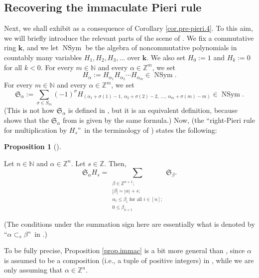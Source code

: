 \documentclass
[numbers=enddot,12pt,final,onecolumn,notitlepage,english]{scrartcl}%
\theoremstyle{definition}
\newtheorem{prop}[theo]{Proposition}
\newenvironment{proposition}[1][]
{\begin{prop}[#1]\begin{leftbar}}
{\end{leftbar}\end{prop}}
\let\sumnonlimits\sum
\renewcommand{\sum}{\sumnonlimits\limits}
\begin{document}
\subsection{Recovering the immaculate Pieri rule}

Next, we shall exhibit \cite[Theorem 3.5]{BBSSZ13} as a consequence of
Corollary \ref{cor.pre-pieri.4}. To this aim, we will briefly introduce the
relevant parts of the scene of \cite[Theorem 3.5]{BBSSZ13}. We fix a
commutative ring $\mathbf{k}$, and we let $\operatorname*{NSym}$ be the
algebra of noncommutative polynomials in countably many variables $H_{1}%
,H_{2},H_{3},\ldots$ over $\mathbf{k}$. We also set $H_{0}:=1$ and $H_{k}:=0$
for all $k<0$. For every $m\in\mathbb{N}$ and every $\alpha\in\mathbb{Z}^{m}$,
we set%
\[
H_{\alpha}:=H_{\alpha_{1}}H_{\alpha_{2}}\cdots H_{\alpha_{m}}\in
\operatorname*{NSym}.
\]
For every $m\in\mathbb{N}$ and every $\alpha\in\mathbb{Z}^{m}$, we set
\[
\mathfrak{S}_{\alpha}:=\sum_{\sigma\in S_{m}}\left(  -1\right)  ^{\sigma
}H_{\left(  \alpha_{1}+\sigma\left(  1\right)  -1,\ \alpha_{2}+\sigma\left(
2\right)  -2,\ \ldots,\ \alpha_{m}+\sigma\left(  m\right)  -m\right)  }%
\in\operatorname*{NSym}.
\]
(This is not how $\mathfrak{S}_{\alpha}$ is defined in \cite{BBSSZ13}, but it
is an equivalent definition, because \cite[Theorem 3.27]{BBSSZ13} shows that
the $\mathfrak{S}_{\alpha}$ from \cite{BBSSZ13} is given by the same formula.)
Now, \cite[Theorem 3.5]{BBSSZ13} (the \textquotedblleft right-Pieri rule for
multiplication by $H_{s}$\textquotedblright\ in the terminology of
\cite{BBSSZ13}) states the following:

\begin{proposition}
\label{prop.immac}Let $n\in\mathbb{N}$ and $\alpha\in\mathbb{Z}^{n}$. Let
$s\in\mathbb{Z}$. Then,%
\[
\mathfrak{S}_{\alpha}H_{s}=\sum_{\substack{\beta\in\mathbb{Z}^{n+1}%
;\\\left\vert \beta\right\vert =\left\vert \alpha\right\vert +s;\\\alpha
_{i}\leq\beta_{i}\text{ for all }i\in\left[  n\right]  ;\\0\leq\beta_{n+1}%
}}\mathfrak{S}_{\beta}.
\]

\end{proposition}

(The conditions under the summation sign here are essentially what is denoted
by \textquotedblleft$\alpha\subset_{s}\beta$\textquotedblright\ in
\cite{BBSSZ13}.)

To be fully precise, Proposition \ref{prop.immac} is a bit more general than
\cite[Theorem 3.5]{BBSSZ13}, since $\alpha$ is assumed to be a composition
(i.e., a tuple of positive integers) in \cite[Theorem 3.5]{BBSSZ13}, while we
are only assuming that $\alpha\in\mathbb{Z}^{n}$.
\end{document}
